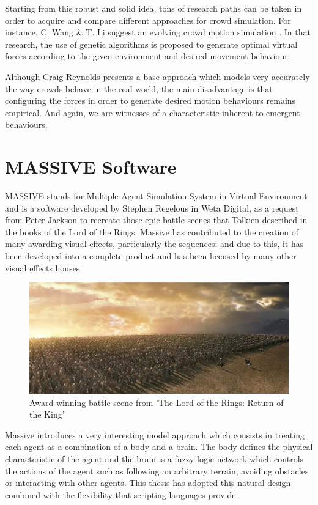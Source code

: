 Starting from this robust and solid idea, tons of research paths can be taken in order to acquire and compare different approaches for crowd simulation. For instance, C. Wang \& T. Li suggest an evolving crowd motion simulation \citep{wang}. In that research, the use of genetic algorithms is proposed to generate optimal virtual forces according to the given environment and desired movement behaviour.

Although Craig Reynolds presents a base-approach which models very accurately the way crowds behave in the real world, the main disadvantage is that configuring the forces in order to generate desired motion behaviours remains empirical. And again, we are witnesses of a characteristic inherent to emergent behaviours.

\section{MASSIVE Software}

MASSIVE stands for Multiple Agent Simulation System in Virtual Environment and is a software developed by Stephen Regelous in Weta Digital, as a request from Peter Jackson to recreate those epic battle scenes that Tolkien described in the books of the Lord of the Rings. Massive has contributed to the creation of many awarding visual effects, particularly  the sequences; and due to this, it has been developed into a complete product and has been licensed by many other visual effects houses.

\begin{figure}[!htb]
  \centering
  \includegraphics[scale=0.5]{rohan_army.eps}
  \caption[Massive Software]{Award winning battle scene from 'The Lord of the Rings: Return of the King'}
  \label{fig:massive}
\end{figure}

Massive introduces a very interesting model approach which consists in treating each agent as a combination of a body and a brain. The body defines the physical characteristic of the agent and the brain is a fuzzy logic network which controls the actions of the agent such as following an arbitrary terrain, avoiding obstacles or interacting with other agents. This thesis has adopted this natural design combined with the flexibility that scripting languages provide.

